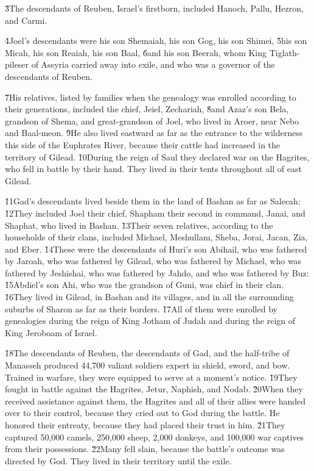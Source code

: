 \v{3}The descendants of Reuben, Israel's firstborn, included Hanoch, Pallu, Hezron, and Carmi.

\v{4}Joel's descendants were his son Shemaiah, his son Gog, his son Shimei, \v{5}his son Micah, his son Reaiah, his son Baal, \v{6}and his son Beerah, whom King Tiglath-pileser of Assyria carried away into exile, and who was a governor of the descendants of Reuben.

\v{7}His relatives, listed by families when the genealogy was enrolled according to their generations, included the chief, Jeiel, Zechariah, \v{8}and Azaz's son Bela, grandson of Shema, and great-grandson of Joel, who lived in Aroer, near Nebo and Baal-meon. \v{9}He also lived eastward as far as the entrance to the wilderness this side of the Euphrates River, because their cattle had increased in the territory of Gilead. \v{10}During the reign of Saul they declared war on the Hagrites, who fell in battle by their hand. They lived in their tents throughout all of east Gilead.

\v{11}Gad's descendants lived beside them in the land of Bashan as far as Salecah: \v{12}They included Joel their chief, Shapham their second in command, Janai, and Shaphat, who lived in Bashan. \v{13}Their seven relatives, according to the households of their clans, included Michael, Meshullam, Sheba, Jorai, Jacan, Zia, and Eber. \v{14}These were the descendants of Huri's son Abihail, who was fathered by Jaroah, who was fathered by Gilead, who was fathered by Michael, who was fathered by Jeshishai, who was fathered by Jahdo, and who was fathered by Buz: \v{15}Abdiel's son Ahi, who was the grandson of Guni, was chief in their clan. \v{16}They lived in Gilead, in Bashan and its villages, and in all the surrounding suburbs of Sharon as far as their borders. \v{17}All of them were enrolled by genealogies during the reign of King Jotham of Judah and during the reign of King Jeroboam of Israel.

\v{18}The descendants of Reuben, the descendants of Gad, and the half-tribe of Manasseh produced 44,700 valiant soldiers expert in shield, sword, and bow. Trained in warfare, they were equipped to serve at a moment's notice. \v{19}They fought in battle against the Hagrites, Jetur, Naphish, and Nodab. \v{20}When they received assistance against them, the Hagrites and all of their allies were handed over to their control, because they cried out to God during the battle. He honored their entreaty, because they had placed their trust in him. \v{21}They captured 50,000 camels, 250,000 sheep, 2,000 donkeys, and 100,000 war captives from their possessions. \v{22}Many fell slain, because the battle's outcome was directed by God. They lived in their territory until the exile.

